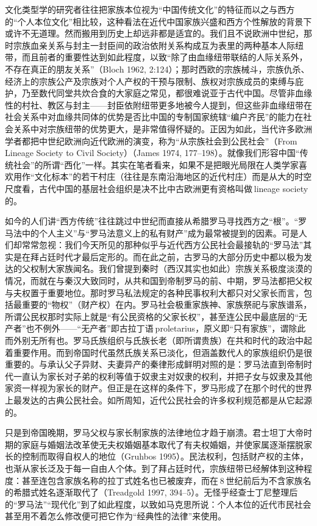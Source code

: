 \documentclass[a4paper,12pt,punct=kaiming,fontset=none]{ctexart}
\begin{document}
文化类型学的研究者往往把家族本位视为“中国传统文化”的特征而以之与西方的“个人本位文化”相比较，这种看法在近代中国家族兴盛和西方个性解放的背景下或许不无道理。然而搬用到历史上却远非都是适宜的。我们且不说欧洲中世纪，那时宗族血亲关系与封主一封臣间的政治依附关系构成互为表里的两种基本人际纽带，而且前者的重要性达到如此程度，以致“除了由血缘纽带联结的人际关系外，不存在真正的朋友关系”（Bloch 1962, 2:124）；那时西欧的宗族械斗，宗族仇杀、经济上的宗族公产及宗族对个人产权的干预与限制、族权对宗族成员的束缚与庇护，乃至数代同堂共炊合食的大家庭之常见，都很难说亚于古代中国。尽管非血缘性的村社、教区与封主——封臣依附纽带更多地被今人提到，但这些非血缘纽带在社会关系中对血缘共同体的优势是否比中国的专制国家统辖“编户齐民”的能力在社会关系中对宗族纽带的优势更大，是非常值得怀疑的。正因为如此，当代许多欧洲学者都把中世纪欧洲向近代欧洲的演变，称为“从宗族社会到公民社会”（From Lineage Society to Civil Society）（James 1974, 177–198）。就像我们形容中国“传统社会”的所谓“西化”一样。其实在笔者看来，如果不是把眼光局限在人类学家喜欢用作“文化标本”的若干村庄（往往是东南沿海地区的近代村庄）而是从大的时空尺度看，古代中国的基层社会组织是决不比中古欧洲更有资格叫做 lineage society 的。

如今的人们讲“西方传统”往往跳过中世纪而直接从希腊罗马寻找西方之“根”。“罗马法中的个人主义”与“罗马法意义上的私有财产”成为最常被提到的因素。可是人们却常常忽视：我们今天所见的那种似乎与近代西方公民社会最接轨的“罗马法”其实是在拜占廷时代才最后定形的。而在此之前，古罗马的大部分历史中都以极为发达的父权制大家族闻名。我们曾提到秦时（西汉其实也如此）宗族关系极度淡漠的情况，而就在与秦汉大致同时，从共和国到帝制罗马的前、中期，罗马法都把父权与夫权置于重要地位。那时罗马私法规定的各种民事权利大都只对父家长而言，包括最重要的“物权”（财产权）在内。罗马社会极重家族神、家族祭祀与家族谱系，所谓公民权那时实际上就是“有公民资格的父家长权”，甚至连公民中最底层的“无产者”也不例外——“无产者”即古拉丁语 proletarius，原义即“只有家族”，谓除此而外别无所有也。罗马氏族组织与氏族长老（即所谓贵族）在共和时代的政治中起着重要作用。而到帝国时代虽然氏族关系已淡化，但涵盖数代人的家族组织仍是很重要的。与承认父子异财、夫妻异产的秦律形成鲜明对照的是：罗马法直到帝制时代一直认为家长对子弟的权利等值于奴隶主对奴隶的权利，并把子女与奴隶及其他家资一样视为家长的财产。但正是在这样的条件下，罗马形成了在那个时代的世界上最发达的古典公民社会。如所周知，近代公民社会的许多权利规范都是从它起源的。

只是到帝国晚期，罗马父权与家长制家族的法律地位才趋于崩溃。君士坦丁大帝时期的家庭与婚姻法改革使无夫权婚姻基本取代了有夫权婚姻，并使家属逐渐摆脱家长的控制而取得自权人的地位（Gruhbos 1995）。民法权利，包括财产权的主体，也渐从家长泛及于每一自由人个体。到了拜占廷时代，宗族纽带已经解体到这种程度：甚至连包含家族名称的拉丁式姓名也已被废弃，而在 8 世纪前后为不含家族名的希腊式姓名逐渐取代了（Treadgold 1997, 394–5）。无怪乎经查士丁尼整理后的“罗马法”“现代化”到了如此程度，以致如马克思所说：个人本位的近代市民社会甚至用不着怎么修改便可把它作为“经典性的法律”来使用。
\end{document}
